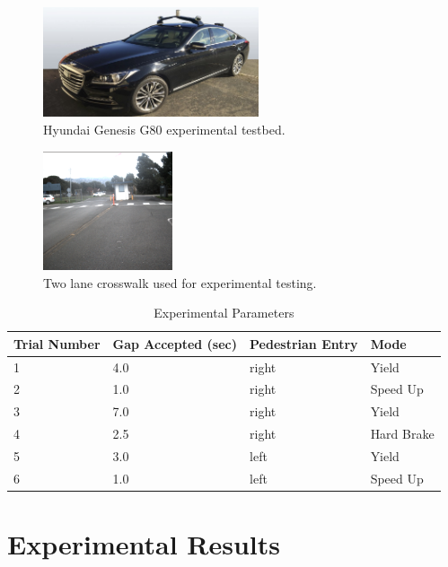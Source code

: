 \documentclass[letterpaper, 10 pt, conference]{ieeeconf} %
\begin{document}
\begin{figure}[h]
\centering
\includegraphics[width=2.5in]{figures/G80.jpg}
\caption{Hyundai Genesis G80 experimental testbed.}
\label{fig:g80}
\end{figure}

\begin{figure}[h]
\centering
\includegraphics[width=1.5in]{figures/crosswalkPic.png}
\caption{Two lane crosswalk used for experimental testing.}
\label{fig:crosswalkpic}
\end{figure}

\begin{table}[h]
\begin{center}
\caption{Experimental Parameters}\label{tb:expparams2}
\begin{tabular}{llll}
Trial Number & Gap Accepted (sec) & Pedestrian Entry & Mode\\\hline\hline
1 & 4.0 & right & Yield\\ 
2 & 1.0 & right & Speed Up\\ 
3 & 7.0 & right & Yield\\ 
4 & 2.5 & right & Hard Brake\\ 
5 & 3.0 & left & Yield \\ 
6 & 1.0 & left & Speed Up\\\hline
\end{tabular}
\end{center}
\end{table}

\section{Experimental Results}
\label{sec:expres}
\end{document}

